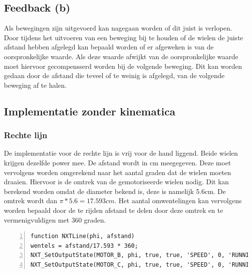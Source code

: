 \documentclass[a4paper]{article}
\begin{document}
\subsection{Feedback  (b)}
Als bewegingen zijn uitgevoerd kan nagegaan worden of dit juist is verlopen. Door tijdens het uitvoeren van een beweging bij te houden of de wielen de juiste afstand hebben afgelegd kan bepaald worden of er afgeweken is van de oorspronkelijke waarde. Als deze waarde afwijkt van de oorspronkelijke waarde moet hiervoor gecompensserd worden bij de volgende beweging. Dit kan worden gedaan door de afstand die teveel of te weinig is afgelegd, van de volgende beweging af te halen.

\subsection{Implementatie zonder kinematica}
\subsubsection{Rechte lijn}
De implementatie voor de rechte lijn is vrij voor de hand liggend. Beide wielen krijgen dezelfde power mee. De afstand wordt in cm meegegeven. Deze moet vervolgens worden omgerekend naar het aantal graden dat de wielen moeten draaien. Hiervoor is de omtrek van de gemotoriseerde wielen nodig. Dit kan berekend worden omdat de diameter bekend is, deze is namelijk 5.6cm. De omtrek wordt dan $\pi * 5.6 = 17.593cm$. Het aantal omwentelingen kan vervolgens worden bepaald door de te rijden afstand te delen door deze omtrek en te vermenigvuldigen met 360 graden.
\begin{lstlisting}[caption=Rechte lijn, label=lst:line, numbers=left]
function NXTLine(phi, afstand)
wentels = afstand/17.593 * 360;
NXT_SetOutputState(MOTOR_B, phi, true, true, 'SPEED', 0, 'RUNNING', wentels, 'dontreply');
NXT_SetOutputState(MOTOR_C, phi, true, true, 'SPEED', 0, 'RUNNING', wentels, 'dontreply');
\end{lstlisting}
\end{document}
